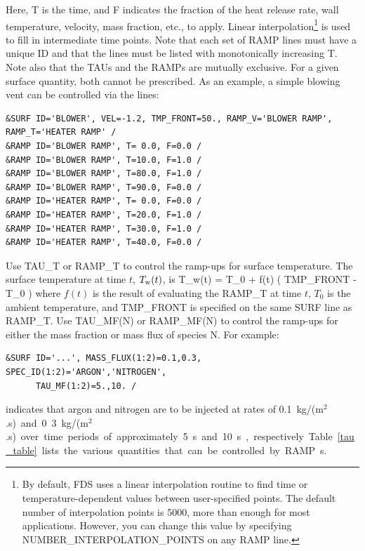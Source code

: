 \documentclass[11pt]{book}
\begin{document}
Here, {\ct T} is the time, and {\ct F} indicates the fraction of the heat release rate, wall temperature, velocity, mass fraction, etc., to apply. Linear interpolation\footnote{By default, FDS uses a linear interpolation routine to find time or temperature-dependent values between user-specified points. The default number of interpolation points is 5000, more than enough for most applications. However, you can change this value by specifying {\ct NUMBER\_INTERPOLATION\_POINTS} on any {\ct RAMP} line.} is used to fill in intermediate time points. Note that each set of {\ct RAMP} lines must have a unique {\ct ID} and that the lines must be listed with monotonically increasing {\ct T}. Note also that the {\ct TAU}s and the {\ct RAMP}s are mutually exclusive. For a given surface quantity, both cannot be prescribed. As an example, a simple blowing vent can be controlled via the lines:
\begin{lstlisting}
&SURF ID='BLOWER', VEL=-1.2, TMP_FRONT=50., RAMP_V='BLOWER RAMP', RAMP_T='HEATER RAMP' /
&RAMP ID='BLOWER RAMP', T= 0.0, F=0.0 /
&RAMP ID='BLOWER RAMP', T=10.0, F=1.0 /
&RAMP ID='BLOWER RAMP', T=80.0, F=1.0 /
&RAMP ID='BLOWER RAMP', T=90.0, F=0.0 /
&RAMP ID='HEATER RAMP', T= 0.0, F=0.0 /
&RAMP ID='HEATER RAMP', T=20.0, F=1.0 /
&RAMP ID='HEATER RAMP', T=30.0, F=1.0 /
&RAMP ID='HEATER RAMP', T=40.0, F=0.0 /
\end{lstlisting}
Use {\ct TAU\_T} or {\ct RAMP\_T} to control the ramp-ups for surface temperature. The surface temperature at time $t$, $T_{\rm w}(t)$, is
\be
   T_{\rm w}(t) = T_0 + f(t) \left( {\ct TMP\_FRONT} - T_0 \right)
\ee
where $f(t)$ is the result of evaluating the {\ct RAMP\_T} at time $t$, $T_0$ is the ambient temperature, and {\ct TMP\_FRONT} is specified on the same {\ct SURF} line as {\ct RAMP\_T}. Use {\ct TAU\_MF(N)} or {\ct RAMP\_MF(N)} to control the ramp-ups for either the mass fraction or mass flux of species {\ct N}. For example:
\begin{lstlisting}
&SURF ID='...', MASS_FLUX(1:2)=0.1,0.3, SPEC_ID(1:2)='ARGON','NITROGEN',
      TAU_MF(1:2)=5.,10. /
\end{lstlisting}
indicates that argon and nitrogen are to be injected at rates of 0.1~\si{kg/(m$^2$.s)} and 0.3~\si{kg/(m$^2$.s)} over time periods of approximately 5~s and 10~s, respectively.

Table~\ref{tau_table} lists the various quantities that can be controlled by {\ct RAMP}s.
\end{document}
